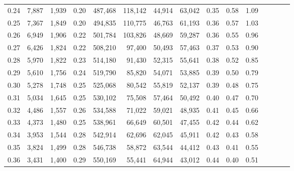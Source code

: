 \begin{tabular}{rrrcrrrrrrrrrrr}
0.24 &   7,887 &  1,939 &                                       0.20 &  487,468 &  118,142 &   44,914 &   63,042 &  0.35 &  0.58 &                         1.09 \\
0.25 &   7,367 &  1,849 &                                       0.20 &  494,835 &  110,775 &   46,763 &   61,193 &  0.36 &  0.57 &                         1.03 \\
0.26 &   6,949 &  1,906 &                                       0.22 &  501,784 &  103,826 &   48,669 &   59,287 &  0.36 &  0.55 &                         0.96 \\
0.27 &   6,426 &  1,824 &                                       0.22 &  508,210 &   97,400 &   50,493 &   57,463 &  0.37 &  0.53 &                         0.90 \\
0.28 &   5,970 &  1,822 &                                       0.23 &  514,180 &   91,430 &   52,315 &   55,641 &  0.38 &  0.52 &                         0.85 \\
0.29 &   5,610 &  1,756 &                                       0.24 &  519,790 &   85,820 &   54,071 &   53,885 &  0.39 &  0.50 &                         0.79 \\
0.30 &   5,278 &  1,748 &                                       0.25 &  525,068 &   80,542 &   55,819 &   52,137 &  0.39 &  0.48 &                         0.75 \\
0.31 &   5,034 &  1,645 &                                       0.25 &  530,102 &   75,508 &   57,464 &   50,492 &  0.40 &  0.47 &                         0.70 \\
0.32 &   4,486 &  1,557 &                                       0.26 &  534,588 &   71,022 &   59,021 &   48,935 &  0.41 &  0.45 &                         0.66 \\
0.33 &   4,373 &  1,480 &                                       0.25 &  538,961 &   66,649 &   60,501 &   47,455 &  0.42 &  0.44 &                         0.62 \\
0.34 &   3,953 &  1,544 &                                       0.28 &  542,914 &   62,696 &   62,045 &   45,911 &  0.42 &  0.43 &                         0.58 \\
0.35 &   3,824 &  1,499 &                                       0.28 &  546,738 &   58,872 &   63,544 &   44,412 &  0.43 &  0.41 &                         0.55 \\
0.36 &   3,431 &  1,400 &                                       0.29 &  550,169 &   55,441 &   64,944 &   43,012 &  0.44 &  0.40 &                         0.51 \\

\end{tabular}
